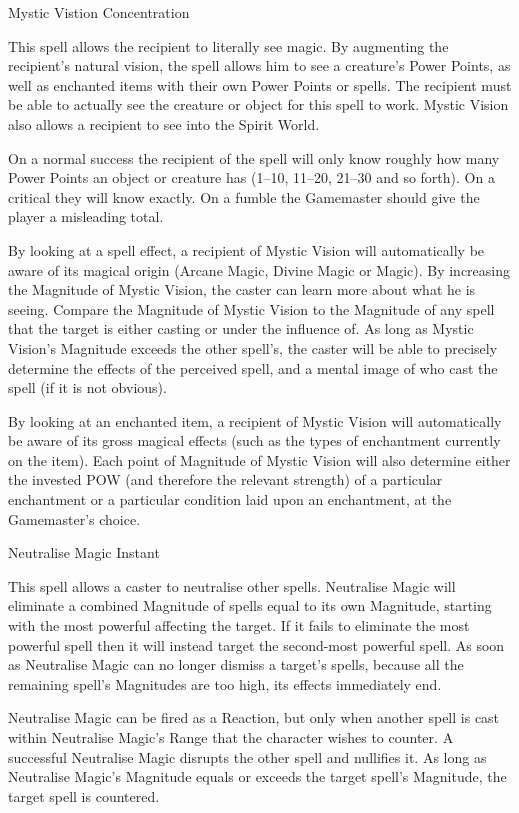 \begin{rpg-spell}
{Mystic Vistion}
{Concentration}

This spell allows the recipient to literally see magic. By augmenting the recipient’s natural vision, the spell allows him to see a creature’s Power Points, as well as enchanted items with their own Power Points or spells. The recipient must be able to actually see the creature or object for this spell to work. Mystic Vision also allows a recipient to see into the Spirit World.

On a normal success the recipient of the spell will only know roughly how many Power Points an object or creature has (1–10, 11–20, 21–30 and so forth). On a critical they will know exactly. On a fumble the Gamemaster should give the player a misleading total.

By looking at a spell effect, a recipient of Mystic Vision will automatically be aware of its magical origin (Arcane Magic, Divine Magic or Magic). By increasing the Magnitude of Mystic Vision, the caster can learn more about what he is seeing. Compare the Magnitude of Mystic Vision to the Magnitude of any spell that the target is either casting or under the influence of. As long as Mystic Vision’s Magnitude exceeds the other spell’s, the caster will be able to precisely determine the effects of the perceived spell, and a mental image of who cast the spell (if it is not obvious). 

By looking at an enchanted item, a recipient of Mystic Vision will automatically be aware of its gross magical effects (such as the types of enchantment currently on the item). Each point of Magnitude of Mystic Vision will also determine either the invested POW (and therefore the relevant strength) of a particular enchantment or a particular condition laid upon an enchantment, at the Gamemaster’s choice.
\end{rpg-spell}


\begin{rpg-spell}
{Neutralise Magic}
{Instant}

This spell allows a caster to neutralise other spells. Neutralise Magic will eliminate a combined Magnitude of spells equal to its own Magnitude, starting with the most powerful affecting the target. If it fails to eliminate the most powerful spell then it will instead target the second-most powerful spell. As soon as Neutralise Magic can no longer dismiss a target’s spells, because all the remaining spell’s Magnitudes are too high, its effects immediately end. 

Neutralise Magic can be fired as a Reaction, but only when another spell is cast within Neutralise Magic’s Range that the character wishes to counter. A successful Neutralise Magic disrupts the other spell and nullifies it. As long as Neutralise Magic’s Magnitude equals or exceeds the target spell’s Magnitude, the target spell is countered. 
\end{rpg-spell}


